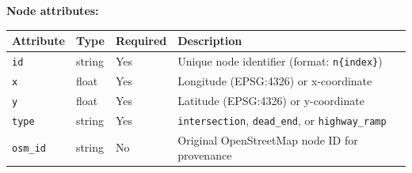 \begin{Shaded}
\begin{Highlighting}[]
\NormalTok{\textless{}}\NormalTok{\textgreater{}}
\NormalTok{  \textless{}}\NormalTok{/\textgreater{}}
\NormalTok{  \textless{}}\NormalTok{\textgreater{}}
\NormalTok{    \textless{}}\NormalTok{/\textgreater{}}
\NormalTok{    \textless{}}\NormalTok{/\textgreater{}}
\NormalTok{  \textless{}/}\NormalTok{\textgreater{}}
\NormalTok{  \textless{}}\NormalTok{\textgreater{}}
\NormalTok{    \textless{}}
\NormalTok{/\textgreater{}}
\NormalTok{  \textless{}/}\NormalTok{\textgreater{}}
\NormalTok{\textless{}/}\NormalTok{\textgreater{}}
\end{Highlighting}
\end{Shaded}

\textbf{Node attributes:}

\begin{longtable}[]{@{}llll@{}}
\toprule\noalign{}
Attribute & Type & Required & Description \\
\midrule\noalign{}
\endhead
\bottomrule\noalign{}
\endlastfoot
\texttt{id} & string & Yes & Unique node identifier (format:
\texttt{n\{index\}}) \\
\texttt{x} & float & Yes & Longitude (EPSG:4326) or x-coordinate \\
\texttt{y} & float & Yes & Latitude (EPSG:4326) or y-coordinate \\
\texttt{type} & string & Yes & \texttt{intersection},
\texttt{dead\_end}, or \texttt{highway\_ramp} \\
\texttt{osm\_id} & string & No & Original OpenStreetMap node ID for
provenance \\
\end{longtable}


